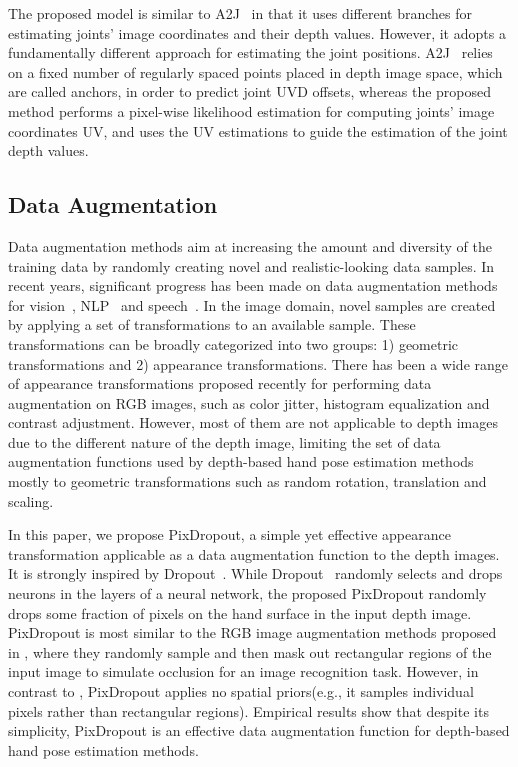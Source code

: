 \documentclass{article}
\begin{document}
\par
The proposed model is similar to A2J~\cite{xiong2019a2j} in that it uses different branches for estimating joints' image coordinates and their depth values. However, it adopts a fundamentally different approach for estimating the joint positions. A2J~\cite{xiong2019a2j} relies on a fixed number of regularly spaced points placed in depth image space, which are called anchors, in order to predict joint UVD offsets, whereas the proposed method performs a pixel-wise likelihood estimation for computing joints' image coordinates UV, and uses the UV estimations to guide the estimation of the joint depth values. \par
 
\subsection{Data Augmentation}
Data augmentation methods aim at increasing the amount and diversity of the training data by randomly creating novel and realistic-looking data samples. In recent years, significant progress has been made on data augmentation methods for vision~\cite{krizhevsky2012imagenet,cubuk2018autoaugment}, NLP~\cite{yu2018qanet} and speech~\cite{hannun2014deep,park2019specaugment}. In the image domain, novel samples are created by applying a set of transformations to an available sample. These transformations can be broadly categorized into two groups: 1) geometric transformations and 2) appearance transformations. There has been a wide range of appearance transformations proposed recently for performing data augmentation on RGB images, such as color jitter, histogram equalization and contrast adjustment. However, most of them are not applicable to depth images due to the different nature of the depth image, limiting the set of data augmentation functions used by depth-based hand pose estimation methods mostly to geometric transformations such as random rotation, translation and scaling.
\par
In this paper, we propose PixDropout, a simple yet effective appearance transformation applicable as a data augmentation function to the depth images. It is strongly inspired by Dropout~\cite{srivastava2014dropout}. While Dropout~\cite{srivastava2014dropout} randomly selects and drops neurons in the layers of a neural network, the proposed PixDropout randomly drops some fraction of pixels on the hand surface in the input depth image. PixDropout is most similar to the RGB image augmentation methods proposed in \cite{devries2017improved,zhong2020random}, where they randomly sample and then mask out rectangular regions of the input image to simulate occlusion for an image recognition task. However, in contrast to \cite{devries2017improved,zhong2020random}, PixDropout applies no spatial priors(e.g., it samples individual pixels rather than rectangular regions). Empirical results show that despite its simplicity, PixDropout is an effective data augmentation function for depth-based hand pose estimation methods.
\end{document}
